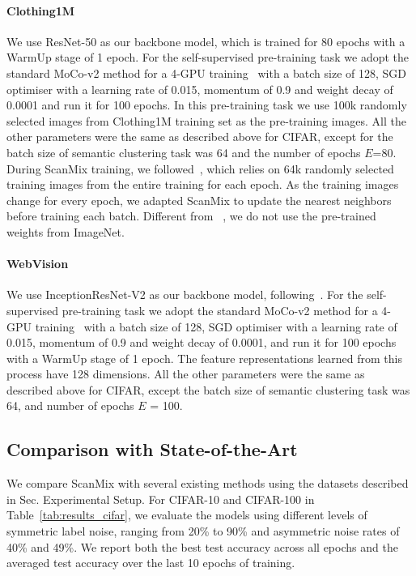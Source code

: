 \documentclass[review]{elsarticle}
\theoremstyle{plain}
\begin{document}
\paragraph{Clothing1M} We use ResNet-50 as our backbone model, which is trained for 80 epochs with a WarmUp stage of 1 epoch. For the self-supervised pre-training task we adopt the standard MoCo-v2 method for a 4-GPU training~\citep{MoCoV2} with a batch size of 128, SGD optimiser with a learning rate of 0.015, momentum of 0.9 and weight decay of 0.0001 and run it for 100 epochs. In this pre-training task we use 100k randomly selected images from Clothing1M training set as the pre-training images. All the other parameters were the same as described above for CIFAR, except for the batch size of semantic clustering task was 64 and the number of epochs $E$=80. During ScanMix training, we followed~\citep{li2020dividemix}, which relies on 64k randomly selected training images from the entire training for each epoch. As the training images change for every epoch, we adapted ScanMix to update the nearest neighbors before training each batch. Different from ~\citep{li2020dividemix}, we do not use the pre-trained weights from ImageNet.


\paragraph{WebVision}
We use InceptionResNet-V2 as our backbone model, following~\citep{li2020dividemix}. For the self-supervised pre-training task we adopt the standard MoCo-v2 method for a 4-GPU training~\citep{MoCoV2} with a batch size of 128, SGD optimiser with a learning rate of 0.015, momentum of 0.9 and weight decay of 0.0001, and run it for 100 epochs with a WarmUp stage of 1 epoch. The feature representations learned from this process have 128 dimensions. All the other parameters were the same as described above for CIFAR, except the batch size of semantic clustering task was 64, and number of epochs $E$ = 100. 



\subsection{Comparison with State-of-the-Art}
\label{sec:comparison_SOTA}

We compare ScanMix with several existing methods using the datasets described in Sec. Experimental Setup. For CIFAR-10 and CIFAR-100 in Table~\ref{tab:results_cifar}, we evaluate the models using different  levels  of  symmetric  label  noise, ranging from  20\%  to  90\% and asymmetric noise rates of 40\% and 49\%.  We report both the best test accuracy across all epochs and the averaged test accuracy over the last 10 epochs of training.  
\end{document}
